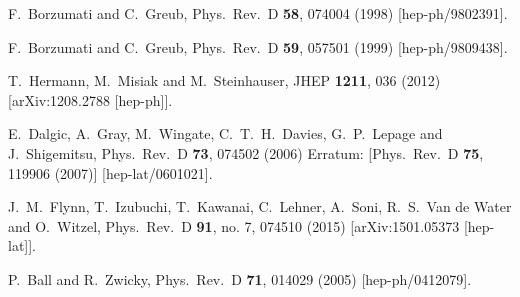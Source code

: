 \documentclass[prd,preprint,superscriptaddress,amsmath,amssymb]{revtex4}
\begin{document}
\begin{thebibliography}{100}
  F.~Borzumati and C.~Greub,
  Phys.\ Rev.\ D {\bf 58}, 074004 (1998)
  [hep-ph/9802391].

  F.~Borzumati and C.~Greub,
  Phys.\ Rev.\ D {\bf 59}, 057501 (1999)
  [hep-ph/9809438].

  T.~Hermann, M.~Misiak and M.~Steinhauser,
  JHEP {\bf 1211}, 036 (2012)
  [arXiv:1208.2788 [hep-ph]].
  

  
  E.~Dalgic, A.~Gray, M.~Wingate, C.~T.~H.~Davies, G.~P.~Lepage and J.~Shigemitsu,
  Phys.\ Rev.\ D {\bf 73}, 074502 (2006)
  Erratum: [Phys.\ Rev.\ D {\bf 75}, 119906 (2007)]
  [hep-lat/0601021].
  

  
  J.~M.~Flynn, T.~Izubuchi, T.~Kawanai, C.~Lehner, A.~Soni, R.~S.~Van de Water and O.~Witzel,
  Phys.\ Rev.\ D {\bf 91}, no. 7, 074510 (2015)
  [arXiv:1501.05373 [hep-lat]].

 
  
  
  P.~Ball and R.~Zwicky,
  Phys.\ Rev.\ D {\bf 71}, 014029 (2005)
  [hep-ph/0412079].
  

\end{thebibliography}
\end{document}
